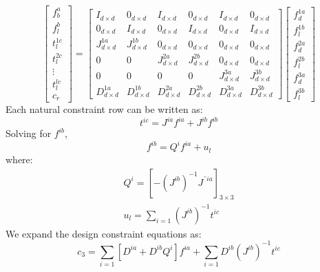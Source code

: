 \documentclass[]{article}
\begin{document}
\begin{equation}
\begin{bmatrix}
f_b^a		\\
f_l^b		\\
t_l^{1c}	\\
t_l^{2c}	\\
\vdots		\\
t_l^{lc}	\\
c_r
\end{bmatrix}
=
\begin{bmatrix}
	I_{d\times d}		&0_{d\times d}		&I_{d\times d}		&0_{d\times d}		&I_{d\times d}		&0_{d\times d} 	\\ 
	0_{d\times d}		&I_{d\times d}		&0_{d\times d} 		&I_{d\times d}		&0_{d\times d}		&I_{d\times d} 	\\ 
	J^{1a}_{d\times d}	&J^{1b}_{d\times d}	&0_{d\times d} 		&0_{d\times d}		&0_{d\times d}		&0_{d\times d} 	\\
	0					&0					&J^{2a}_{d\times d}	&J^{2b}_{d\times d}	&0_{d\times d}		&0_{d\times d}	\\ 
	0					&0					&0					&0					&J^{3a}_{d\times d}	&J^{3b}_{d\times d}\\ 
	D^{1a}_{d\times d}	&D^{1b}_{d\times d}	&D^{2a}_{d\times d}	&D^{2b}_{d\times d}	&D^{3a}_{d\times d}	&D^{3b}_{d\times d}	
\end{bmatrix}
\begin{bmatrix}
f_d^{1a} 	\\
f_l^{1b} 	\\
f_d^{2a}	\\
f_l^{2b}	\\
f_d^{3a} 	\\
f_l^{3b} 	
\end{bmatrix}
\label{eq:parallelVirtualModelEquation}
\end{equation}
Each natural constraint row can be written as:
\begin{equation}
t^{ic}=J^{ia}f^{ia}+J^{ib}f^{ib}	
\end{equation}
Solving for $f^{ib}$,
\begin{equation}
	\label{eq:fib}	
	f^{ib}=Q^if^{ia}+u_l
\end{equation}
where:
\begin{eqnarray}
Q^i=[-(J^{ib})^{-1}J^{ˆia}]_{3\times3}	\\	
u_l=\sum_{i=1}(J^{ib})^{-1}t^{ic}			
\end{eqnarray}
We expand the design constraint equations as:
\begin{equation}
c_3=\sum_{i=1}[D^{ia}+D^{ib}Q^i]f^{ia}+\sum_{i=1}D^{ib}(J^{ib})^{-1}t^{ic}
\label{eq:c3}
\end{equation}
\end{document}
